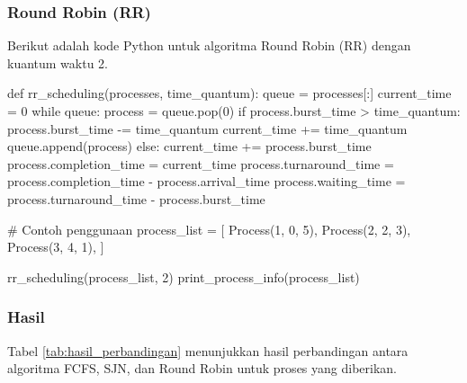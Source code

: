 \documentclass[12pt]{article}
\begin{document}
\subsubsection{Round Robin (RR)}
Berikut adalah kode Python untuk algoritma Round Robin (RR) dengan kuantum waktu 2.

\begin{python}[language=Python, caption=Kode Python untuk penjadwalan Round Robin (RR)]
def rr_scheduling(processes, time_quantum):
    queue = processes[:]
    current_time = 0
    while queue:
        process = queue.pop(0)
        if process.burst_time > time_quantum:
            process.burst_time -= time_quantum
            current_time += time_quantum
            queue.append(process)
        else:
            current_time += process.burst_time
            process.completion_time = current_time
            process.turnaround_time = process.completion_time - process.arrival_time
            process.waiting_time = process.turnaround_time - process.burst_time

# Contoh penggunaan
process_list = [
    Process(1, 0, 5),
    Process(2, 2, 3),
    Process(3, 4, 1),
]

rr_scheduling(process_list, 2)
print_process_info(process_list)
\end{python}

\subsubsection{Hasil}
Tabel \ref{tab:hasil_perbandingan} menunjukkan hasil perbandingan antara algoritma FCFS, SJN, dan Round Robin untuk proses yang diberikan.
\end{document}
